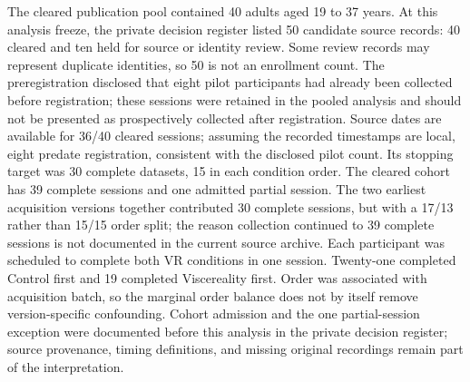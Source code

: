 The cleared publication pool contained 40 adults aged 19 to 37 years. At this analysis freeze, the private decision register listed 50 candidate source records: 40 cleared and ten held for source or identity review. Some review records may represent duplicate identities, so 50 is not an enrollment count. The preregistration disclosed that eight pilot participants had already been collected before registration; these sessions were retained in the pooled analysis and should not be presented as prospectively collected after registration. Source dates are available for 36/40 cleared sessions; assuming the recorded timestamps are local, eight predate registration, consistent with the disclosed pilot count. Its stopping target was 30 complete datasets, 15 in each condition order. The cleared cohort has 39 complete sessions and one admitted partial session. The two earliest acquisition versions together contributed 30 complete sessions, but with a 17/13 rather than 15/15 order split; the reason collection continued to 39 complete sessions is not documented in the current source archive. Each participant was scheduled to complete both VR conditions in one session. Twenty-one completed Control first and 19 completed Viscereality first. Order was associated with acquisition batch, so the marginal order balance does not by itself remove version-specific confounding. Cohort admission and the one partial-session exception were documented before this analysis in the private decision register; source provenance, timing definitions, and missing original recordings remain part of the interpretation.

